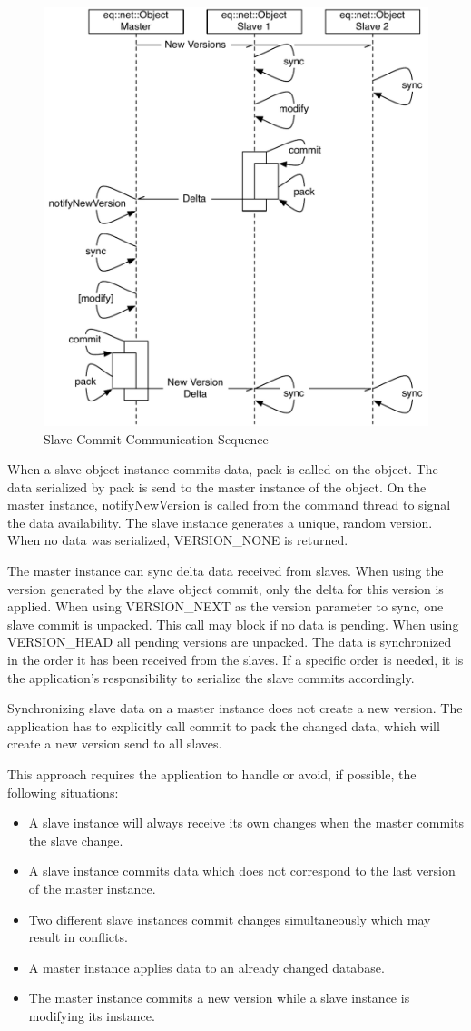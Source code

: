 \documentclass[10pt,a4]{scrartcl}
\begin{document}
\begin{figure}
  \includegraphics[width=.618\textwidth]{images/slaveWrites.pdf}
  {\caption{\label{fSlaveCommit}Slave Commit Communication Sequence}}
\end{figure}
When a slave object instance commits data, \textsf{pack} is called on the
object. The data serialized by \textsf{pack} is send to the master instance of
the object. On the master instance, \textsf{notifyNewVersion} is called from the
command thread to signal the data availability. The slave instance generates a
unique, random version. When no data was serialized, \textsf{VERSION\_NONE} is
returned.

The master instance can \textsf{sync} delta data received from slaves. When
using the version generated by the slave object commit, only the delta for this
version is applied. When using \textsf{VERSION\_NEXT} as the version parameter
to \textsf{sync}, one slave commit is unpacked. This call may block if no data
is pending. When using \textsf{VERSION\_HEAD} all pending versions are
unpacked. The data is synchronized in the order it has been received from the
slaves. If a specific order is needed, it is the application's responsibility to
serialize the slave commits accordingly.

Synchronizing slave data on a master instance does not create a new version. The
application has to explicitly call \textsf{commit} to pack the changed data,
which will create a new version send to all slaves.

This approach requires the application to handle or avoid, if possible, the
following situations:
\begin{itemize}
\item A slave instance will always receive its own changes when the master
  commits the slave change.
\item A slave instance commits data which does not correspond to the last
  version of the master instance.
\item Two different slave instances commit changes simultaneously which may
  result in conflicts.
\item A master instance applies data to an already changed database.
\item The master instance commits a new version while a slave instance is
  modifying its instance. 
\end{itemize}
\end{document}
